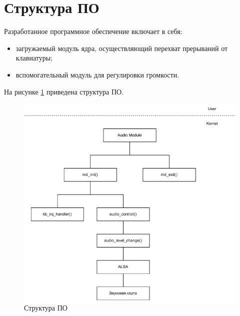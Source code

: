 \clearpage

\section{Структура ПО}

Разработанное программное обеспечение включает в себя:
\begin{itemize}
    \item загружаемый модуль ядра, осуществляющий перехват прерываний от клавиатуры;
    \item вспомогательный модуль для регулировки громкости.
\end{itemize}

 На рисунке \ref{fig:module_struct} приведена структура ПО.
 \begin{figure}[h!btp]
	\centering
	\includegraphics[scale = 1]{inc/diag/module_struct.pdf}
	\caption{Структура ПО}
	\label{fig:module_struct}	
\end{figure}


